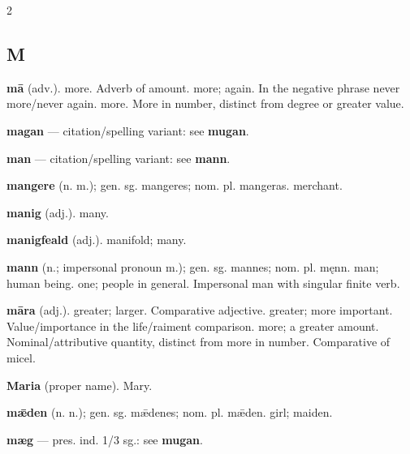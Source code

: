 \begin{multicols*}{2}
\subsection*{M}
\textbf{mā} (adv.). more. Adverb of amount. more; again. In the negative phrase never more/never again. more. More in number, distinct from degree or greater value.\par
\textbf{magan} — citation/spelling variant: see \textbf{mugan}.\par
\textbf{man} — citation/spelling variant: see \textbf{mann}.\par
\textbf{mangere} (n. m.); gen. sg. mangeres; nom. pl. mangeras. merchant.\par
\textbf{manig} (adj.). many.\par
\textbf{manigfeald} (adj.). manifold; many.\par
\textbf{mann} (n.; impersonal pronoun m.); gen. sg. mannes; nom. pl. męnn. man; human being. one; people in general. Impersonal man with singular finite verb.\par
\textbf{māra} (adj.). greater; larger. Comparative adjective. greater; more important. Value/importance in the life/raiment comparison. more; a greater amount. Nominal/attributive quantity, distinct from more in number. Comparative of micel.\par
\textbf{Maria} (proper name). Mary.\par
\textbf{mǣden} (n. n.); gen. sg. mǣdenes; nom. pl. mǣden. girl; maiden.\par
\textbf{mæg} — pres. ind. 1/3 sg.: see \textbf{mugan}.\par

\end{multicols*}
